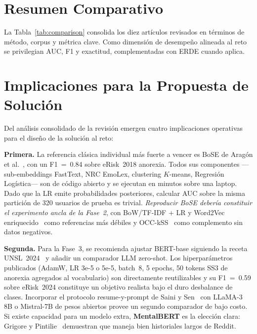 \documentclass[journal]{IEEEtran}
\begin{document}
\section{Resumen Comparativo}

La Tabla~\ref{tab:comparison} consolida los diez artículos revisados en términos de método, corpus y métrica clave. Como dimensión de desempeño alineada al reto se privilegian AUC, F1 y exactitud, complementadas con ERDE cuando aplica.

\section{Implicaciones para la Propuesta de Solución}

Del análisis consolidado de la revisión emergen cuatro implicaciones operativas para el diseño de la solución al reto:

\textbf{Primera.} La referencia clásica individual más fuerte a vencer es BoSE de Aragón et al.~\cite{aragon2023bose}, con un F1~=~0.84 sobre eRisk~2018 anorexia. Todos sus componentes ---sub-embeddings FastText, NRC EmoLex, clustering $K$-means, Regresión Logística--- son de código abierto y se ejecutan en minutos sobre una laptop. Dado que la LR emite probabilidades posteriores, calcular AUC sobre la misma partición de 320 usuarios de prueba es trivial. \emph{Reproducir BoSE debería constituir el experimento ancla de la Fase~2}, con BoW/TF-IDF + LR y Word2Vec enriquecido~\cite{ramirez2020enhanced} como referencias más débiles y OCC-kSS~\cite{aguilera2021oneclass} como complemento sin datos negativos.

\textbf{Segunda.} Para la Fase~3, se recomienda ajustar BERT-base siguiendo la receta UNSL~2024~\cite{thompson2024timeaware} y añadir un comparador LLM zero-shot. Los hiperparámetros publicados (AdamW, LR 3e-5 o 5e-5, batch~8, 5 epochs, 50 tokens SS3 de anorexia agregados al vocabulario) son directamente reutilizables y su F1~=~0.59 sobre eRisk~2024 constituye un objetivo realista bajo el duro desbalance de clases. Incorporar el protocolo resume-y-prompt de Saini y Sen~\cite{saini2026patchtst} con LLaMA-3 8B o Mistral-7B de pesos abiertos provee un segundo comparador de bajo costo. Si existe capacidad para un modelo extra, \textbf{MentalBERT} es la elección clara: Grigore y Pintilie~\cite{grigore2023mentalbert} demuestran que maneja bien historiales largos de Reddit.
\end{document}
